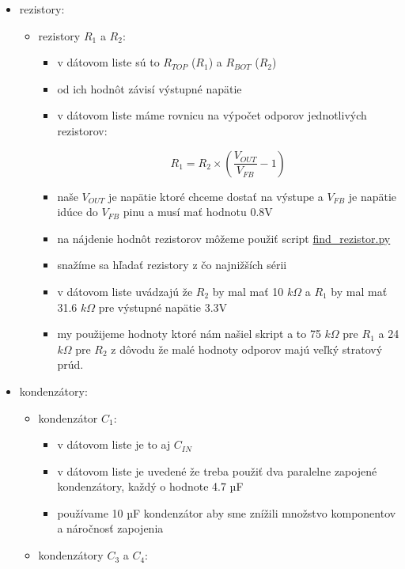 \begin{itemize}

\item 
    rezistory: 
    \begin{itemize}
        \item 
        rezistory $R_1$ a $R_2$:
        \begin{itemize}
            \item 
            v dátovom liste sú to $R_{TOP}$ ($R_1$) a $R_{BOT}$ ($R_2$)
            \item 
            od ich hodnôt závisí výstupné napätie
            \item 
            v dátovom liste máme rovnicu na výpočet odporov jednotlivých rezistorov:

            \begin{equation}
                    R_{1} = R_{2} \times \left(\frac{V_{OUT}}{V_{FB}} - 1\right)
            \end{equation}
            \item
            naše $V_{OUT}$ je napätie ktoré chceme dostať na výstupe a $V_{FB}$ je napätie idúce do $V_{FB}$ pinu a musí mať hodnotu 0.8V
            \item 
            na nájdenie hodnôt rezistorov môžeme použiť script \href{https://github.com/ostertag/UACS/tree/hardwear_kozuch/power_suply_shc_1/find_rezistor}{find\_rezistor.py}
            \item 
            snažíme sa hľadať rezistory z čo najnižších sérii
            \item 
            v dátovom liste uvádzajú že $R_2$ by mal mať 10 $k\Omega$ a $R_1$ by mal mať 31.6 $k\Omega$ pre výstupné napätie 3.3V
            \item 
            my použijeme hodnoty ktoré nám našiel skript a to 75 $k\Omega$ pre $R_1$  a 24 $k\Omega$ pre $R_2$ z dôvodu že malé hodnoty odporov majú veľký stratový prúd.  
        \end{itemize}
    \end{itemize}
\item
  kondenzátory:

  \begin{itemize}
  \item
    kondenzátor $C_1$:

    \begin{itemize}
    
    \item
      v dátovom liste je to aj $C_{IN}$
    \item
      v dátovom liste je uvedené že treba použiť dva paralelne zapojené
      kondenzátory, každý o hodnote 4.7 µF
    \item
      používame 10 µF kondenzátor aby sme znížili množstvo komponentov a
      náročnosť zapojenia
    \end{itemize}
  \item
    kondenzátory $C_3$ a $C_4$:


\end{itemize}
\end{itemize}
